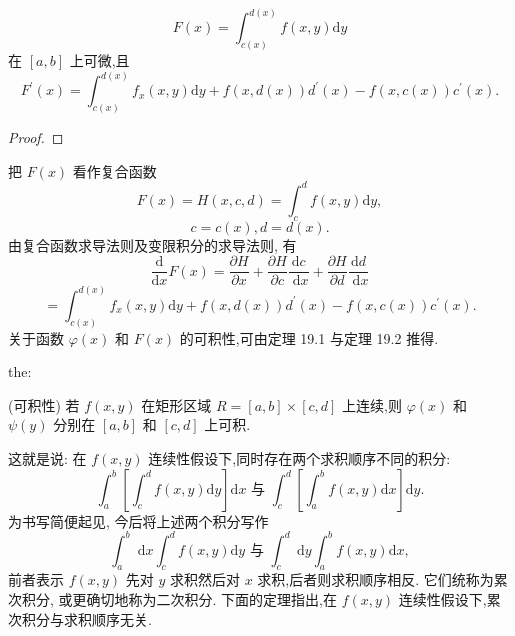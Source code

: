 \[
F\left( x\right)  = {\int }_{c\left( x\right) }^{d\left( x\right) }f\left( {x,y}\right) \mathrm{d}y
\]
在 \(\left\lbrack  {a,b}\right\rbrack\) 上可微,且
\[
{F}^{\prime }\left( x\right)  = {\int }_{c\left( x\right) }^{d\left( x\right) }{f}_{x}\left( {x,y}\right) \mathrm{d}y + f\left( {x,d\left( x\right) }\right) {d}^{\prime }\left( x\right)  - f\left( {x,c\left( x\right) }\right) {c}^{\prime }\left( x\right) . \tag{7}
\]
\begin{proof}

\end{proof}
把 \(F\left( x\right)\) 看作复合函数
\[
F\left( x\right)  = H\left( {x,c,d}\right)  = {\int }_{c}^{d}f\left( {x,y}\right) \mathrm{d}y,
\]
\[
c = c\left( x\right) ,d = d\left( x\right) .
\]
由复合函数求导法则及变限积分的求导法则, 有
\[
\frac{\mathrm{d}}{\mathrm{d}x}F\left( x\right)  = \frac{\partial H}{\partial x} + \frac{\partial H}{\partial c}\frac{\mathrm{d}c}{\mathrm{\;d}x} + \frac{\partial H}{\partial d}\frac{\mathrm{d}d}{\mathrm{\;d}x}
\]
\[
= {\int }_{c\left( x\right) }^{d\left( x\right) }{f}_{x}\left( {x,y}\right) \mathrm{d}y + f\left( {x,d\left( x\right) }\right) {d}^{\prime }\left( x\right)  - f\left( {x,c\left( x\right) }\right) {c}^{\prime }\left( x\right) .
\]
关于函数 \(\varphi \left( x\right)\) 和 \(F\left( x\right)\) 的可积性,可由定理 19.1 与定理 19.2 推得.

\begin{theorem}{}{the:}

\end{theorem}
 (可积性) 若 \(f\left( {x,y}\right)\) 在矩形区域 \(R = \left\lbrack  {a,b}\right\rbrack   \times  \left\lbrack  {c,d}\right\rbrack\) 上连续,则 \(\varphi \left( x\right)\) 和 \(\psi \left( y\right)\) 分别在 \(\left\lbrack  {a,b}\right\rbrack\) 和 \(\left\lbrack  {c,d}\right\rbrack\) 上可积.

这就是说: 在 \(f\left( {x,y}\right)\) 连续性假设下,同时存在两个求积顺序不同的积分:
\[
{\int }_{a}^{b}\left\lbrack  {{\int }_{c}^{d}f\left( {x,y}\right) \mathrm{d}y}\right\rbrack  \mathrm{d}x\text{ 与 }{\int }_{c}^{d}\left\lbrack  {{\int }_{a}^{b}f\left( {x,y}\right) \mathrm{d}x}\right\rbrack  \mathrm{d}y.
\]
为书写简便起见, 今后将上述两个积分写作
\[
{\int }_{a}^{b}\mathrm{\;d}x{\int }_{c}^{d}f\left( {x,y}\right) \mathrm{d}y\text{ 与 }{\int }_{c}^{d}\mathrm{\;d}y{\int }_{a}^{b}f\left( {x,y}\right) \mathrm{d}x,
\]
前者表示 \(f\left( {x,y}\right)\) 先对 \(y\) 求积然后对 \(x\) 求积,后者则求积顺序相反. 它们统称为累次积分, 或更确切地称为二次积分. 下面的定理指出,在 \(f\left( {x,y}\right)\) 连续性假设下,累次积分与求积顺序无关.


